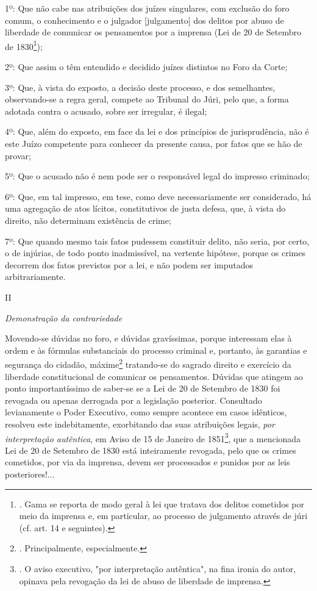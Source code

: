 1º: Que não cabe nas atribuições dos juízes singulares, com exclusão do
foro comum, o conhecimento e o julgador {[}julgamento{]} dos delitos por
abuso de liberdade de comunicar os pensamentos por a imprensa (Lei de 20
de Setembro de 1830\footnote{. Gama se reporta de modo geral à lei que
  tratava dos delitos cometidos por meio da imprensa e, em particular,
  ao processo de julgamento através de júri (cf. art. 14 e seguintes).});

2º: Que assim o têm entendido e decidido juízes distintos no Foro da
Corte;

3º: Que, à vista do exposto, a decisão deste processo, e dos
semelhantes, observando-se a regra geral, compete ao Tribunal do Júri,
pelo que, a forma adotada contra o acusado, sobre ser irregular, é
ilegal;

4º: Que, além do exposto, em face da lei e dos princípios de
jurisprudência, não é este Juízo competente para conhecer da presente
causa, por fatos que se hão de provar;

5º: Que o acusado não é nem pode ser o responsável legal do impresso
criminado;

6º: Que, em tal impresso, em tese, como deve necessariamente ser
considerado, há uma agregação de atos lícitos, constitutivos de justa
defesa, que, à vista do direito, não determinam existência de crime;

7º: Que quando mesmo tais fatos pudessem constituir delito, não seria,
por certo, o de injúrias, de todo ponto inadmissível, na vertente
hipótese, porque os crimes decorrem dos fatos previstos por a lei, e não
podem ser imputados arbitrariamente.

II

\emph{Demonstração da contrariedade}

Movendo-se dúvidas no foro, e dúvidas gravíssimas, porque interessam
elas à ordem e às fórmulas substanciais do processo criminal e,
portanto, às garantias e segurança do cidadão, máxime\footnote{.
  Principalmente, especialmente.} tratando-se do sagrado direito e
exercício da liberdade constitucional de comunicar os pensamentos.
Dúvidas que atingem ao ponto importantíssimo de saber-se se a Lei de 20
de Setembro de 1830 foi revogada ou apenas derrogada por a legislação
posterior. Consultado levianamente o Poder Executivo, como sempre
acontece em casos idênticos, resolveu este indebitamente, exorbitando
das suas atribuições legais, \emph{por interpretação autêntica}, em
Aviso de 15 de Janeiro de 1851\footnote{. O aviso executivo, "por
  interpretação autêntica", na fina ironia do autor, opinava pela
  revogação da lei de abuso de liberdade de imprensa.}, que a mencionada
Lei de 20 de Setembro de 1830 está inteiramente revogada, pelo que os
crimes cometidos, por via da imprensa, devem ser processados e punidos
por as leis posteriores!...

